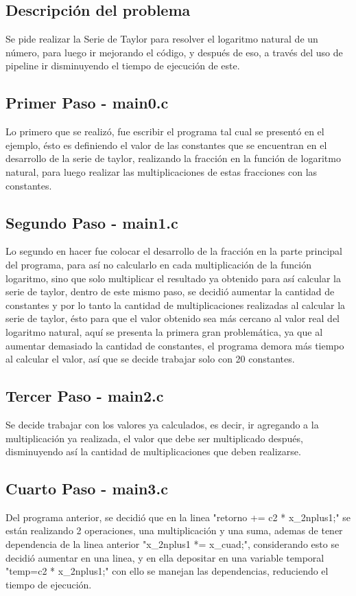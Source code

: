 \documentclass[12pt,letterpaper]{article}
\begin{document}
\subsection{Descripción del problema}
Se pide realizar la Serie de Taylor para resolver el logaritmo natural de un número, para luego ir mejorando el código, y después de eso, a través del uso de pipeline ir disminuyendo el tiempo de ejecución de este.

\subsection{Primer Paso - main0.c}
Lo primero que se realizó, fue escribir el programa tal cual se presentó en el ejemplo, ésto es definiendo el valor de las constantes que se encuentran en el desarrollo de la serie de taylor, realizando la fracción en la función de logaritmo natural, para luego realizar las multiplicaciones de estas fracciones con las constantes.

\subsection{Segundo Paso - main1.c}
Lo segundo en hacer fue colocar el desarrollo de la fracción en la parte principal del programa, para así no calcularlo en cada multiplicación de la función logaritmo, sino que solo multiplicar el resultado ya obtenido para así calcular la serie de taylor, dentro de este mismo paso, se decidió aumentar la cantidad de constantes y por lo tanto la cantidad de multiplicaciones realizadas al calcular la serie de taylor, ésto para que el valor obtenido sea más cercano al valor real del logaritmo natural, aquí se presenta la primera gran problemática, ya que al aumentar demasiado la cantidad de constantes, el programa demora más tiempo al calcular el valor, así que se decide trabajar solo con 20 constantes.

\subsection{Tercer Paso - main2.c}
Se decide trabajar con los valores ya calculados, es decir, ir agregando a la multiplicación ya realizada, el valor que debe ser multiplicado después, disminuyendo así la cantidad de multiplicaciones que deben realizarse.

\subsection{Cuarto Paso - main3.c}
Del programa anterior, se decidió que en la linea "retorno += c2 * x_2nplus1;" se están realizando 2 operaciones, una multiplicación y una suma, ademas de tener dependencia de la linea anterior "x_2nplus1 *= x_cuad;", considerando esto se decidió aumentar en una linea, y en ella depositar en una variable temporal   "temp=c2 * x_2nplus1;" con ello se manejan las dependencias, reduciendo el tiempo de ejecución.
\end{document}
